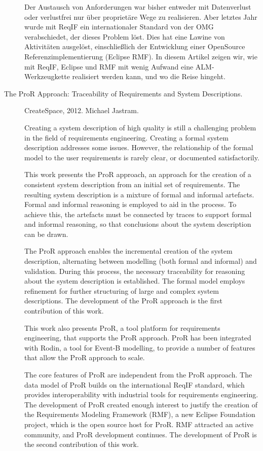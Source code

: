 \begin{description}
Der Austausch von Anforderungen war bisher entweder mit Datenverlust oder verlustfrei nur über proprietäre Wege zu realisieren. Aber letztes Jahr wurde mit ReqIF ein internationaler Standard von der OMG verabschiedet, der dieses Problem löst. Dies hat eine Lawine von Aktivitäten ausgelöst, einschließlich der Entwicklung einer OpenSource Referenzimplementierung (Eclipse RMF). In diesem Artikel zeigen wir, wie mit ReqIF, Eclipse und RMF mit wenig Aufwand eine ALM-Werkzeugkette realisiert werden kann, und wo die Reise hingeht.

\item[The ProR Approach: Traceability of Requirements and System Descriptions.] CreateSpace, 2012. Michael Jastram.

Creating a system description of high quality is still a challenging problem in the field of requirements engineering. Creating a formal system description addresses some issues. However, the relationship of the formal model to the user requirements is rarely clear, or documented satisfactorily.

This work presents the ProR approach, an approach for the creation of a consistent system description from an initial set of requirements. The resulting system description is a mixture of formal and informal artefacts. Formal and informal reasoning is employed to aid in the process. To achieve this, the artefacts must be connected by traces to support formal and informal reasoning, so that conclusions about the system description can be drawn.

The ProR approach enables the incremental creation of the system description, alternating between modelling (both formal and informal) and validation. During this process, the necessary traceability for reasoning about the system description is established. The formal model employs refinement for further structuring of large and complex system descriptions. The development of the ProR approach is the first contribution of this work.

This work also presents ProR, a tool platform for requirements engineering, that supports the ProR approach. ProR has been integrated with Rodin, a tool for Event-B modelling, to provide a number of features that allow the ProR approach to scale.

The core features of ProR are independent from the ProR approach. The data model of ProR builds on the international ReqIF standard, which provides interoperability with industrial tools for requirements engineering. The development of ProR created enough interest to justify the creation of the Requirements Modeling Framework (RMF), a new Eclipse Foundation project, which is the open source host for ProR. RMF attracted an active community, and ProR development continues. The development of ProR is the second contribution of this work.


\end{description}
